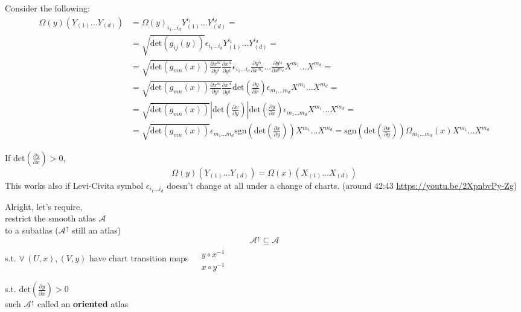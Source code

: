 \documentclass[10pt, twoside]{amsart}
\begin{document}
\begin{multicols*}{2}
Consider the following:
\[
\begin{aligned}
\Omega(y)(Y_{(1)} \dots Y_{(d)} ) & = \Omega(y)_{i_1 \dots i_d}Y_{(1)}^{i_1} \dots Y_{(d)}^{i_d} =  \\
& = \sqrt{ \text{det}(g_{ij}(y)) } \epsilon_{i_1 \dots i_d} Y^{i_1}_{(1)} \dots Y^{i_d}_{(d)} = \\
& = \sqrt{ \text{det}(g_{mn}(x)) \frac{ \partial x^m}{ \partial y^i} \frac{ \partial x^n }{ \partial y^j} } \epsilon_{i_1 \dots i_d} \frac{ \partial y^{i_1}}{ \partial x^{m_1} } \dots \frac{ \partial y^{i_d} }{ \partial x^{m_d} } X^{m_1} \dots X^{m_d}  = \\
& = \sqrt{ \text{det}(g_{mn}(x))\frac{ \partial x^m}{ \partial y^i} \frac{ \partial x^n}{ \partial y^j}} \text{det}\left( \frac{ \partial y}{ \partial x}\right) \epsilon_{m_1 \dots m_d} X^{m_1} \dots X^{m_d} = \\
& = \sqrt{ \text{det}(g_{mn}(x)) } \left| \text{det}\left( \frac{ \partial x}{ \partial y} \right) \right| \text{det}\left( \frac{ \partial y}{ \partial x} \right) \epsilon_{m_1 \dots m_d} X^{m_1} \dots X^{m_d} = \\
& = \sqrt{\text{det}(g_{mn}(x))} \epsilon_{m_1 \dots m_d} \text{sgn}\left(\text{det}\left( \frac{ \partial x}{ \partial y} \right) \right) X^{m_1} \dots X^{m_d} = \text{sgn}(\text{det}\left( \frac{ \partial x}{ \partial y} \right)) \Omega_{m_1 \dots m_d}(x) X^{m_1} \dots X^{m_d}
\end{aligned}
\]

If $\text{det}\left( \frac{ \partial y}{ \partial x} \right) > 0$, 
\[
\Omega(y)(Y_{(1)} \dots Y_{(d)})  = \Omega(x)(X_{(1)} \dots X_{(d)} )
\]
This works also if Levi-Civita symbol $\epsilon_{i_1\dots i_d}$ doesn't change at all under a change of charts. (around 42:43 \url{https://youtu.be/2XpnbvPy-Zg})

\hrulefill

Alright, let's require, \\
\phantom{\quad \, } restrict the smooth atlas $\mathcal{A}$ \\
\phantom{\quad \quad \, } to a subatlas ($\mathcal{A}^{\uparrow}$ still an atlas) 
\[
\mathcal{A}^{\uparrow} \subseteq \mathcal{A}
\]
s.t. $\forall \, (U,x), (V,y)$ have chart transition maps $\begin{aligned} & \quad \\ 
& y\circ x^{-1} \\ 
& x\circ y^{-1} \end{aligned}$

s.t. $\text{det}\left( \frac{ \partial y}{ \partial x} \right) >0$  \\
\phantom{ \quad \, } such $\mathcal{A}^{\uparrow} $ called an \textbf{oriented} atlas 


\end{multicols*}
\end{document}
